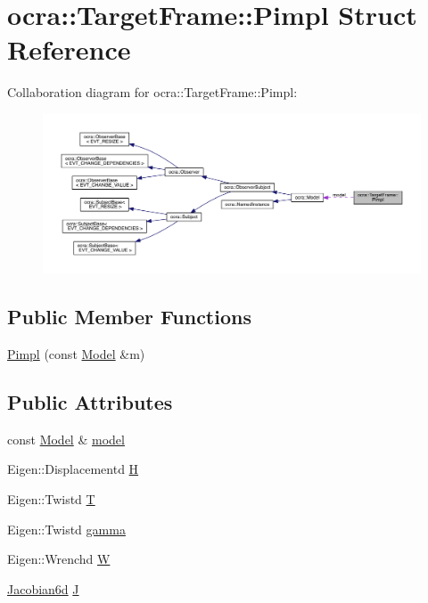 \hypertarget{structocra_1_1TargetFrame_1_1Pimpl}{}\section{ocra\+:\+:Target\+Frame\+:\+:Pimpl Struct Reference}
\label{structocra_1_1TargetFrame_1_1Pimpl}


Collaboration diagram for ocra\+:\+:Target\+Frame\+:\+:Pimpl\+:
\nopagebreak
\begin{figure}[H]
\begin{center}
\leavevmode
\includegraphics[width=350pt]{da/d25/structocra_1_1TargetFrame_1_1Pimpl__coll__graph}
\end{center}
\end{figure}
\subsection*{Public Member Functions}
\begin{DoxyCompactItemize}
\item 
\hyperlink{structocra_1_1TargetFrame_1_1Pimpl_a01712cd9b98c68bfce55c2edab2cc846}{Pimpl} (const \hyperlink{classocra_1_1Model}{Model} \&m)
\end{DoxyCompactItemize}
\subsection*{Public Attributes}
\begin{DoxyCompactItemize}
\item 
const \hyperlink{classocra_1_1Model}{Model} \& \hyperlink{structocra_1_1TargetFrame_1_1Pimpl_a7edc0b09f919bb223a44001cdba8dc84}{model}
\item 
Eigen\+::\+Displacementd \hyperlink{structocra_1_1TargetFrame_1_1Pimpl_a84a376863b43fa29115be56fa326d8df}{H}
\item 
Eigen\+::\+Twistd \hyperlink{structocra_1_1TargetFrame_1_1Pimpl_aecb4d2e7692ee0ff9298e8802756e098}{T}
\item 
Eigen\+::\+Twistd \hyperlink{structocra_1_1TargetFrame_1_1Pimpl_a1c9e215a8979352974e88f7606a738b7}{gamma}
\item 
Eigen\+::\+Wrenchd \hyperlink{structocra_1_1TargetFrame_1_1Pimpl_a4ff4bfb5366d48f34539e73fa7b18351}{W}
\item 
\hyperlink{namespaceocra_ac73b015f9f7cb0c252c4d5c4800f559a}{Jacobian6d} \hyperlink{structocra_1_1TargetFrame_1_1Pimpl_afc2a059aca6dc89c5da22b1b86b36922}{J}
\end{DoxyCompactItemize}


